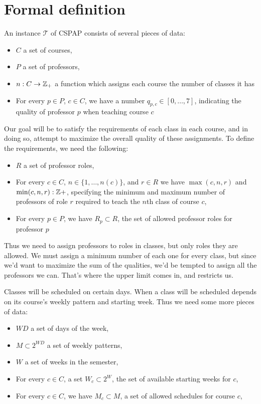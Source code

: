 \section{Formal definition}
An instance $\mathcal{T}$ of CSPAP consists of several pieces of data:

\begin{itemize}
\item $C$ a set of courses,
\item $P$ a set of professors,
\item $n: C \to \mathbb{Z}_+$ a function which assigns each course the number of classes it has
\item For every $p \in P$, $c \in C$, we have a number $q_{p, c} \in [0, \dots, 7]$, indicating the quality of professor $p$ when teaching course $c$
\end{itemize}

Our goal will be to satisfy the requirements of each class in each course, and in doing so, attempt to maximize the overall quality of these assignments. To define the requirements, we need the following:
\begin{itemize}
\item $R$ a set of professor roles,
\item For every $c \in C$, $n \in \{1, \dots, n(c)\}$, and $r \in R$ we have $\max(c, n, r)$ and $\min(c, n, r): \mathbb{Z}+$, specifying the minimum and maximum number of professors of role $r$ required to teach the $n$th class of course $c$,
\item For every $p \in P$, we have $R_p \subset R$, the set of allowed professor roles for professor $p$
\end{itemize}

Thus we need to assign professors to roles in classes, but only roles they are allowed. We must assign a minimum number of each one for every class, but since we'd want to maximize the sum of the qualities, we'd be tempted to assign all the professors we can. That's where the upper limit comes in, and restricts us.

Classes will be scheduled on certain days. When a class will be scheduled depends on its course's weekly pattern and starting week. Thus we need some more pieces of data:
\begin{itemize}
\item $WD$ a set of days of the week,
\item $M \subset 2^{WD}$ a set of weekly patterns,
\item $W$ a set of weeks in the semester,
\item For every $c \in C$, a set $W_c \subset 2^W$, the set of available starting weeks for $c$,
\item For every $c \in C$, we have $M_c \subset M$, a set of allowed schedules for course $c$,
\end{itemize}

